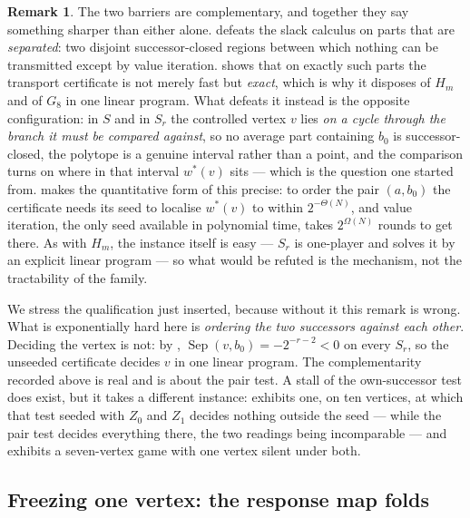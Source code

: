 \documentclass[11pt]{article}
\theoremstyle{plain}
\theoremstyle{definition}
\newtheorem{remark}[theorem]{Remark}
\begin{document}
\begin{remark}\label{rem:transport}
The two barriers are complementary, and together they say something
sharper than either alone.  defeats the slack
calculus on parts that are \emph{separated}: two disjoint successor-closed
regions between which nothing can be transmitted except by value
iteration.  shows that on exactly such parts the
transport certificate is not merely fast but \emph{exact}, which is why
it disposes of $H_m$ and of $G_8$ in one linear program. What defeats it
instead is the opposite configuration: in $S$ and in $S_r$ the controlled
vertex $v$ lies \emph{on a cycle through the branch it must be compared
against}, so no average part containing $b_0$ is successor-closed, the
polytope is a genuine interval rather than a point, and the comparison
turns on where in that interval $w^\ast(v)$ sits --- which is the question
one started from.  makes the quantitative
form of this precise: to order the pair $(a,b_0)$ the certificate needs its
seed to localise $w^\ast(v)$ to within $2^{-\Theta(N)}$, and value iteration,
the only seed available in polynomial time, takes $2^{\Omega(N)}$ rounds to get
there. As with $H_m$, the instance itself is easy --- $S_r$ is one-player
and  solves it by an explicit linear program --- so
what would be refuted is the mechanism, not the tractability of the family.

We stress the qualification just inserted, because without it this remark is
wrong. What is exponentially hard here is \emph{ordering the two successors
against each other}. Deciding the vertex is not: by ,
$\operatorname{Sep}(v,b_0)=-2^{-r-2}<0$ on every $S_r$, so the unseeded
certificate decides $v$ in one linear program. The complementarity recorded
above is real and is about the pair test. A stall of the own-successor test
does exist, but it takes a different instance:  exhibits
one, on ten vertices, at which that test seeded with $Z_0$ and $Z_1$ decides
nothing outside the seed --- while the pair test decides everything there,
the two readings being incomparable --- and  exhibits a
seven-vertex game with one vertex silent under both.
\end{remark}


\subsection{Freezing one vertex: the response map folds}\label{sec:fold}
\end{document}
